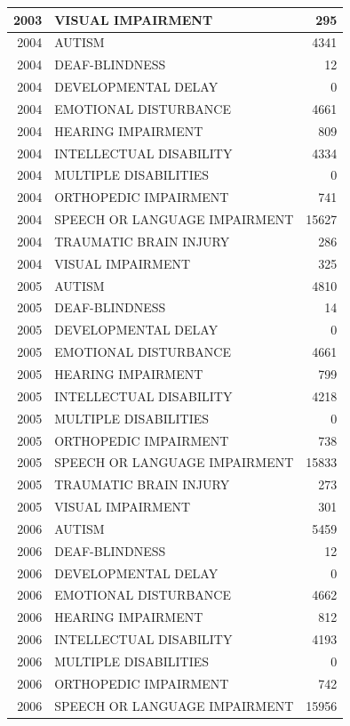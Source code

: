 \documentclass[
  english,
  man]{apa6}
\begin{document}
\begin{tabular}{r|l|r}
\hline
2003 & VISUAL IMPAIRMENT & 295\\
\hline
2004 & AUTISM & 4341\\
\hline
2004 & DEAF-BLINDNESS & 12\\
\hline
2004 & DEVELOPMENTAL DELAY & 0\\
\hline
2004 & EMOTIONAL DISTURBANCE & 4661\\
\hline
2004 & HEARING IMPAIRMENT & 809\\
\hline
2004 & INTELLECTUAL DISABILITY & 4334\\
\hline
2004 & MULTIPLE DISABILITIES & 0\\
\hline
2004 & ORTHOPEDIC IMPAIRMENT & 741\\
\hline
2004 & SPEECH OR LANGUAGE IMPAIRMENT & 15627\\
\hline
2004 & TRAUMATIC BRAIN INJURY & 286\\
\hline
2004 & VISUAL IMPAIRMENT & 325\\
\hline
2005 & AUTISM & 4810\\
\hline
2005 & DEAF-BLINDNESS & 14\\
\hline
2005 & DEVELOPMENTAL DELAY & 0\\
\hline
2005 & EMOTIONAL DISTURBANCE & 4661\\
\hline
2005 & HEARING IMPAIRMENT & 799\\
\hline
2005 & INTELLECTUAL DISABILITY & 4218\\
\hline
2005 & MULTIPLE DISABILITIES & 0\\
\hline
2005 & ORTHOPEDIC IMPAIRMENT & 738\\
\hline
2005 & SPEECH OR LANGUAGE IMPAIRMENT & 15833\\
\hline
2005 & TRAUMATIC BRAIN INJURY & 273\\
\hline
2005 & VISUAL IMPAIRMENT & 301\\
\hline
2006 & AUTISM & 5459\\
\hline
2006 & DEAF-BLINDNESS & 12\\
\hline
2006 & DEVELOPMENTAL DELAY & 0\\
\hline
2006 & EMOTIONAL DISTURBANCE & 4662\\
\hline
2006 & HEARING IMPAIRMENT & 812\\
\hline
2006 & INTELLECTUAL DISABILITY & 4193\\
\hline
2006 & MULTIPLE DISABILITIES & 0\\
\hline
2006 & ORTHOPEDIC IMPAIRMENT & 742\\
\hline
2006 & SPEECH OR LANGUAGE IMPAIRMENT & 15956\\

\end{tabular}
\end{document}
